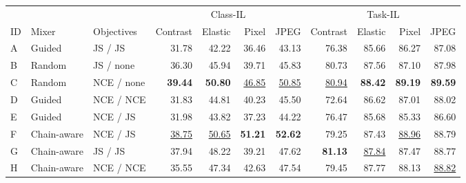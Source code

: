 \begin{center}
\begin{minipage}{\textwidth}
\centering\small
\setlength{\tabcolsep}{6pt}
\begin{tabular}{lllrrrrrrrr}
\toprule
 &  &  & \multicolumn{4}{c}{Class-IL} & \multicolumn{4}{c}{Task-IL} \\
ID & Mixer & Objectives & Contrast & Elastic & Pixel & JPEG & Contrast & Elastic & Pixel & JPEG \\
\midrule
A & Guided & JS / JS & 31.78 & 42.22 & 36.46 & 43.13 & 76.38 & 85.66 & 86.27 & 87.08 \\
B & Random & JS / none & 36.30 & 45.94 & 39.71 & 45.83 & 80.73 & 87.56 & 87.10 & 87.98 \\
C & Random & NCE / none & \textbf{39.44} & \textbf{50.80} & \underline{46.85} & \underline{50.85} & \underline{80.94} & \textbf{88.42} & \textbf{89.19} & \textbf{89.59} \\
D & Guided & NCE / NCE & 31.83 & 44.81 & 40.23 & 45.50 & 72.64 & 86.62 & 87.01 & 88.02 \\
E & Guided & NCE / JS & 31.98 & 43.82 & 37.23 & 44.22 & 76.47 & 85.68 & 85.33 & 86.60 \\
\rowcolor{ourrow} F & Chain-aware & NCE / JS & \underline{38.75} & \underline{50.65} & \textbf{51.21} & \textbf{52.62} & 79.25 & 87.43 & \underline{88.96} & 88.79 \\
G & Chain-aware & JS / JS & 37.94 & 48.22 & 39.21 & 47.62 & \textbf{81.13} & \underline{87.84} & 87.47 & 88.77 \\
H & Chain-aware & NCE / NCE & 35.55 & 47.34 & 42.63 & 47.54 & 79.45 & 87.77 & 88.13 & \underline{88.82} \\
\bottomrule
\end{tabular}
\end{minipage}
\end{center}

